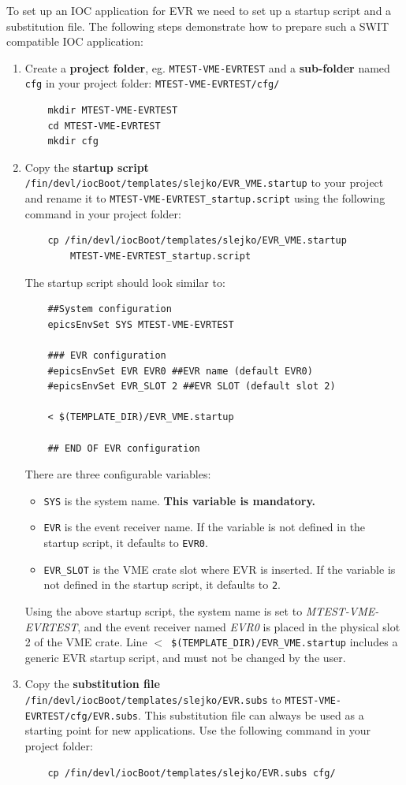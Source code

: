 \documentclass[12pt,a4paper]{article}
\begin{document}
To set up an IOC application for EVR we need to set up a startup script and a substitution file. The following steps demonstrate how to prepare such a SWIT compatible IOC application:
\begin{enumerate}

	\item Create a \textbf{project folder}, eg. \texttt{MTEST-VME-EVRTEST} and a \textbf{sub-folder} named \texttt{cfg} in your project folder: \texttt{MTEST-VME-EVRTEST/cfg/}
\begin{verbatim}
	mkdir MTEST-VME-EVRTEST
	cd MTEST-VME-EVRTEST
	mkdir cfg
\end{verbatim}

	\item Copy the \textbf{startup script} \texttt{/fin/devl/iocBoot/templates/slejko/EVR\_VME.startup} to your project and rename it to \texttt{MTEST-VME-EVRTEST\_startup.script} using the following command in your project folder:
\begin{verbatim}
	cp /fin/devl/iocBoot/templates/slejko/EVR_VME.startup 
	    MTEST-VME-EVRTEST_startup.script
\end{verbatim}

	The startup script should look similar to:
\begin{verbatim}
	##System configuration
	epicsEnvSet SYS MTEST-VME-EVRTEST
	
	### EVR configuration
	#epicsEnvSet EVR EVR0 ##EVR name (default EVR0)
	#epicsEnvSet EVR_SLOT 2 ##EVR SLOT (default slot 2)
	
	< $(TEMPLATE_DIR)/EVR_VME.startup
	
	## END OF EVR configuration
\end{verbatim}

There are three configurable variables:
\begin{itemize}
	\item
		\texttt{SYS} is the system name. \textbf{This variable is mandatory.}
	\item 
		\texttt{EVR} is the event receiver name. If the variable is not defined in the startup script, it defaults to \texttt{EVR0}.
	\item 
		\texttt{EVR\_SLOT} is the VME crate slot where EVR is inserted. If the variable is not defined in the startup script, it defaults to \texttt{2}.
\end{itemize}
Using the above startup script, the system name is set to \textit{MTEST-VME-EVRTEST}, and the event receiver named \textit{EVR0} is placed in the physical slot 2 of the VME crate. Line \texttt{$<$ \$(TEMPLATE\_DIR)/EVR\_VME.startup} includes a generic EVR startup script, and must not be changed by the user.

	\item Copy the \textbf{substitution file} \texttt{/fin/devl/iocBoot/templates/slejko/EVR.subs} to \texttt{MTEST-VME-EVRTEST/cfg/EVR.subs}. This substitution file can always be used as a starting point for new applications. Use the following command in your project folder: 
\begin{verbatim}
	cp /fin/devl/iocBoot/templates/slejko/EVR.subs cfg/
\end{verbatim}
\end{enumerate}
\end{document}

